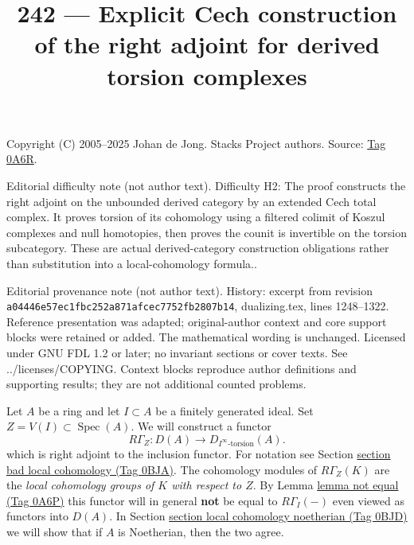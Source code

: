 \documentclass{amsart}
\theoremstyle{plain}
\theoremstyle{definition}
\theoremstyle{remark}
\numberwithin{equation}{subsection}
\def\Spec{\mathop{\mathrm{Spec}}}
\begin{document}
\title[Stacks Project, Tag 0A6R]{242 --- Explicit Cech construction of the right adjoint for derived torsion complexes}
\maketitle
\noindent Copyright (C) 2005--2025 Johan de Jong. Stacks Project authors. Source: \href{https://stacks.math.columbia.edu/tag/0A6R}{Tag 0A6R}.

\noindent Editorial difficulty note (not author text). Difficulty H2: The proof constructs the right adjoint on the unbounded derived category by an extended Cech total complex. It proves torsion of its cohomology using a filtered colimit of Koszul complexes and null homotopies, then proves the counit is invertible on the torsion subcategory. These are actual derived-category construction obligations rather than substitution into a local-cohomology formula..

\noindent Editorial provenance note (not author text). History: excerpt from revision \texttt{a0444\allowbreak 6e57e\allowbreak c1fbc\allowbreak 252a8\allowbreak 71afc\allowbreak ec775\allowbreak 2fb28\allowbreak 07b14}, dualizing.tex, lines 1248--1322. Reference presentation was adapted; original-author context and core support blocks were retained or added. The mathematical wording is unchanged. Licensed under GNU FDL 1.2 or later; no invariant sections or cover texts. See ../licenses/COPYING. Context blocks reproduce author definitions and supporting results; they are not additional counted problems.

\noindent
Let $A$ be a ring and let $I \subset A$ be a finitely generated ideal.
Set $Z = V(I) \subset \Spec(A)$. We will construct a functor
\begin{equation}
\label{equation-local-cohomology}
R\Gamma_Z : D(A) \longrightarrow D_{I^\infty\text{-torsion}}(A).
\end{equation}
which is right adjoint to the inclusion functor. For notation
see Section \href{https://stacks.math.columbia.edu/tag/0BJA}{section bad local cohomology (Tag 0BJA)}. The cohomology
modules of $R\Gamma_Z(K)$ are the {\it local cohomology groups
of $K$ with respect to $Z$}.
By Lemma \href{https://stacks.math.columbia.edu/tag/0A6P}{lemma not equal (Tag 0A6P)} this functor will in general {\bf not} be
equal to $R\Gamma_I( - )$ even viewed as functors into $D(A)$.
In Section \href{https://stacks.math.columbia.edu/tag/0BJD}{section local cohomology noetherian (Tag 0BJD)}
we will show that if $A$ is Noetherian, then the two agree.
\end{document}
